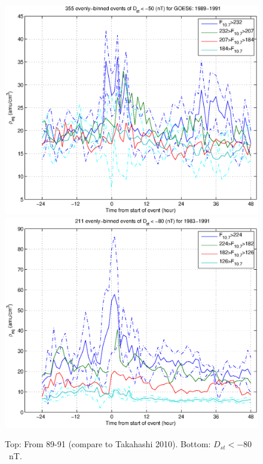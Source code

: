 \documentclass[10pt,twocolumn]{article}
\begin{document}
\begin{figure}[htp!]
\includegraphics[scale=0.45]{paperfigures/HighLowF107rhoeq-Dst50-GOES6-1989-1991.eps}
\includegraphics[scale=0.45]{paperfigures/HighLowF107rhoeq-Dst80.eps}
\caption{Top: From 89-91 (compare to Takahashi 2010). Bottom:  $D_{st}<-80$~nT.}
\end{figure}
\end{document}
